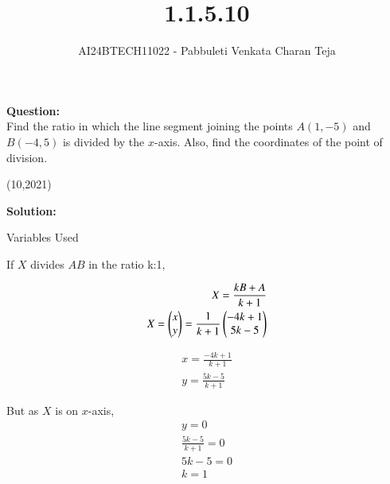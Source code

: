 \documentclass[journal]{IEEEtran}
\begin{document}

\vspace{3cm}

\title{1.1.5.10}
\author{AI24BTECH11022 - Pabbuleti Venkata Charan Teja}
\maketitle

\renewcommand{\thefigure}{\theenumi}
\renewcommand{\thetable}{\theenumi}

\textbf{Question:}\\
Find the ratio in which the line segment joining the points $A(1,-5)$ and $B(-4,5)$ is divided by the $x$-axis. Also, find the coordinates of the point of division.

\hfill{(10,2021)}

\textbf{Solution:}

\begin{table}[h!]
\renewcommand{\thetable}{1}
    \centering
   
   \def\tablename{Table}
   \caption{Variables Used}
    \label{tab1.1.5.10.1}
\end{table}
If $X$ divides $AB$ in the ratio k:1,

\begin{align}
X=\frac{kB+A}{k+1} \label{eq1.1.5.10.2} \\
X=
\begin{pmatrix}
x \\
y \\
\end{pmatrix} 
=\frac{1}{k+1}
\begin{pmatrix}
-4k+1 \\
5k-5 \\
\end{pmatrix} \label{eq1.1.5.10.3}
\end{align}

\begin{align}
x=\frac{-4k+1}{k+1} \label{eq1.1.5.10.43} \\
y=\frac{5k-5}{k+1} \label{eq1.1.5.10.5}
\end{align}

But as $X$ is on $x$-axis,
\begin{align}
y=0\\
\frac{5k-5}{k+1}=0 \label{eq1.1.5.10.6} \\
5k-5=0 \label{eq1.1.5.10.7} \\
k=1 \label{eq1.1.5.10.8}
\end{align}
\end{document}
